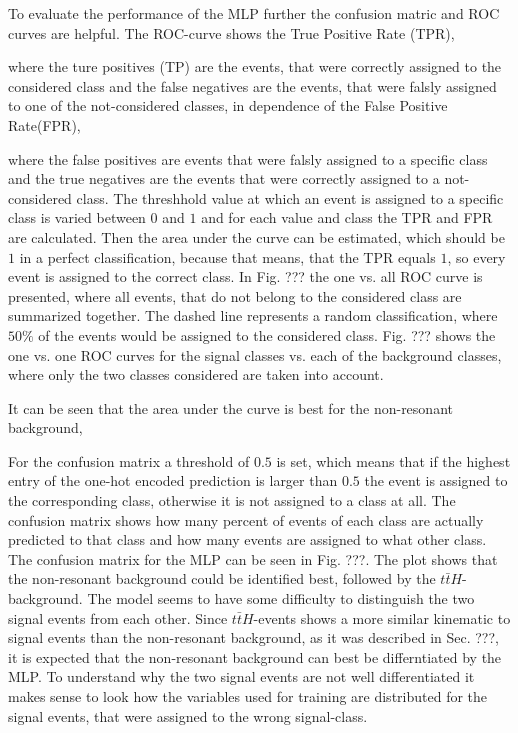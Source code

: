 
To evaluate the performance of the MLP further the confusion matric and ROC curves are helpful. The ROC-curve shows the True Positive Rate (TPR),


where the ture positives (TP) are the events, that were correctly assigned to the considered class and the false negatives are the events, that were falsly assigned to one of the not-considered classes,
in dependence of the False Positive Rate(FPR),


where the false positives are events that were falsly assigned to a specific class and the true negatives are the events that were correctly assigned to a not-considered class.
The threshhold value at which an event is assigned to a specific class is varied between $0$ and $1$ and for each value and class the TPR and FPR are calculated. Then the area under the curve can be estimated,
which should be $1$ in a perfect classification, because that means, that the TPR equals $1$, so every event is assigned to the correct class. In Fig. ??? the one vs. all ROC curve is presented,
where all events, that do not belong to the considered class are summarized together. The dashed line represents a random classification, where $50 \%$ of the events would be assigned to the considered
class. Fig. ??? shows the one vs. one ROC curves for the signal classes vs. each of the background classes, where only the two classes considered
are taken into account. 

It can be seen that the area under the curve is best for the non-resonant background, 

For the confusion matrix a threshold of $0.5$ is set, which means that if the highest entry
of the one-hot encoded prediction is larger than $0.5$ the event is assigned to the corresponding class, otherwise it is not assigned to a class at all. The confusion matrix shows
how many percent of events of each class are actually predicted to that class and how many events are assigned to what other class. The confusion matrix for the MLP can be seen in Fig. ???.
The plot shows that the non-resonant background could be identified best, followed by the $t \bar{t} H$-background. The model seems to have some difficulty to distinguish
the two signal events from each other. Since $t \bar{t} H$-events shows a more similar kinematic to signal events than the non-resonant background, as it was described in Sec. ???, it is expected
that the non-resonant background can best be differntiated by the MLP. To understand why the two signal events are not well differentiated it makes sense to look how the variables used for training
are distributed for the signal events, that were assigned to the wrong signal-class.